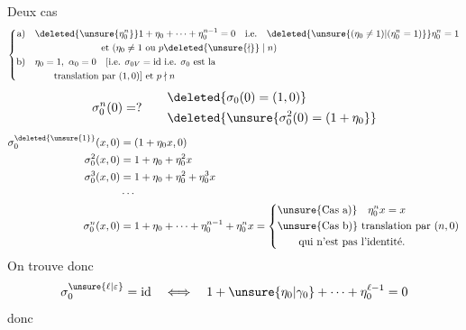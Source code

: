 Deux cas
\[
\left\{\begin{aligned}
\text{a)}\quad&\deleted{\unsure{\eta_0^n}}1+\eta_0+\cdots+\eta_0^{n-1}=0\quad\text{i.e.}\quad
\deleted{\unsure{(\eta_0\ne1)|(\eta_0^n=1)}}\eta_0^n=1\\
&\hspace{7em}\text{et }(\eta_0\ne1\text{ ou }p\deleted{\unsure{\nmid}}\mid n)\\
\text{b)}\quad&\eta_0=1,\ \alpha_0=0\quad[\text{i.e. }\sigma_{0V}=\mathrm{id}\text{ i.e. }\sigma_0\text{ est la}\\
&\qquad\text{translation par }(1,0)]\text{ et }p\nmid n
\end{aligned}\right.
\]
\[
\sigma_0^n(0)=?\qquad
\begin{aligned}
&\deleted{\sigma_0(0)=(1,0)}\\
&\deleted{\unsure{\sigma_0^2(0)=(1+\eta_0}}
\end{aligned}
\]
\[
\begin{aligned}
\sigma_0^{\deleted{\unsure{1}}}(x,0)&=(1+\eta_0x,0)\\
\sigma_0^2(x,0)&=1+\eta_0+\eta_0^2x\\
\sigma_0^3(x,0)&=1+\eta_0+\eta_0^2+\eta_0^3x\\
&\cdots\\
\sigma_0^n(x,0)&=1+\eta_0+\cdots+\eta_0^{n-1}+\eta_0^n x
=\left\{\begin{aligned}
&\text{\unsure{Cas a)}}\quad\eta_0^n x=x\\
&\text{\unsure{Cas b)} translation par }(n,0)\\
&\qquad\text{qui n'est pas l'identité.}
\end{aligned}\right.
\end{aligned}
\]
On trouve donc
\[
\sigma_0^{\unsure{\ell|\varepsilon}}=\mathrm{id}\quad\Longleftrightarrow\quad
1+\unsure{\eta_0|\gamma_0}+\cdots+\eta_0^{\ell-1}=0
\]
donc

